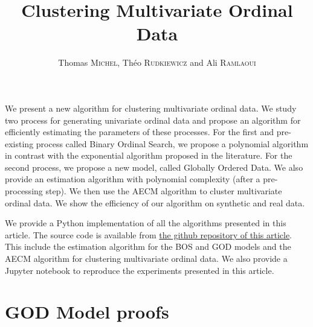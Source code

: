\documentclass{ipol}
\title{Clustering Multivariate Ordinal Data}
\author{Thomas \textsc{Michel}, Théo \textsc{Rudkiewicz} and Ali \textsc{Ramlaoui}}
\begin{document}
\tableofcontents

\begin{ipolAbstract}
    We present a new algorithm for clustering multivariate ordinal data. We study two process for generating univariate ordinal data and propose an algorithm for efficiently estimating the parameters of these processes. For the first and pre-existing process called Binary Ordinal Search, we propose a polynomial algorithm in contrast with the exponential algorithm proposed in the literature. For the second process, we propose a new model, called Globally Ordered Data. We also provide an estimation algorithm with polynomial complexity (after a pre-processing step). We then use the AECM algorithm to cluster multivariate ordinal data. We show the efficiency of our algorithm on synthetic and real data. 
\end{ipolAbstract}

\begin{ipolCode}
    We provide a Python implementation of all the algorithms presented in this article. The source code is available from \href{https://github.com/Thomick/Ordinal-data-clustering}{the github repository of this article}. This include the estimation algorithm for the BOS and GOD models and the AECM algorithm for clustering multivariate ordinal data.
    We also provide a Jupyter notebook to reproduce the experiments presented in this article. 
\end{ipolCode}






















\appendix







\section{GOD Model proofs}
\label{appendix:god}


\end{document}
